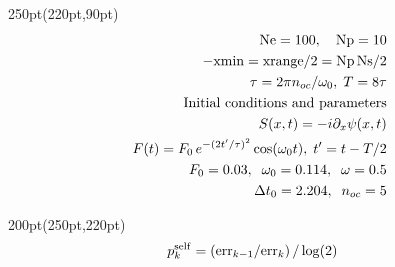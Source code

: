 \begin{frame}
\begin{textblock*}{250pt}(220pt,90pt)
	\begin{align}
      {\rm Ne} = 100,\hspace{10pt} {\rm Np}  = 10   &\nonumber\\
		-{\rm xmin} = {\rm xrange}/2  = {\rm Np\,Ns}/2  &\nonumber\\
\tau = 2\pi n_{oc}/\omega_0,\;T=8\tau  &\nonumber\\\vspace{10pt}
	  \mbox{Initial conditions and parameters}  &\nonumber\\
		    S(x,t) = -i\partial_x\psi(x,t)  &\nonumber\\
F(t) = F_0\,e^{-(2t^\prime/\tau)^2}\cos(\omega_0 t), \;
t^\prime = t - T/2
		&\nonumber\\
      F_0 = 0.03,\;\;\omega_0=0.114,\;\;\omega= 0.5 \nonumber\\
    \Delta t_0 = 2.204,\;\;n_{oc}=5 \nonumber
         \end{align}
\end{textblock*}
\begin{textblock*}{200pt}(250pt,220pt)
	\begin{align}
	p_k^{\rm self} & = \left({\rm err}_{k-1}/{\rm err}_{k}\right)/\log(2) \nonumber
	\end{align}

\end{textblock*}


\end{frame}







